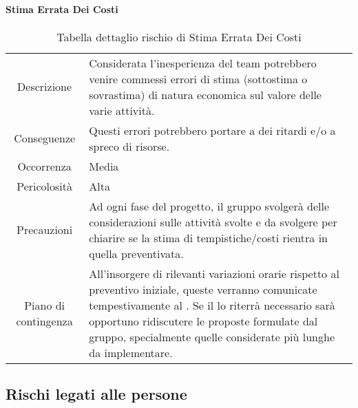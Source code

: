 \paragraph*{Stima Errata Dei Costi}
\renewcommand{\arraystretch}{1}
    \begin{table}[H]
        \begin{center}
            \setlength{\aboverulesep}{0pt}
            \setlength{\belowrulesep}{0pt}
            \setlength{\extrarowheight}{.75ex}
            \begin{tabular}{ c p{10cm} }
                \rowcolor{AzzurroGruppo!30} 
                \toprule
                Descrizione & Considerata l'inesperienza del team potrebbero venire commessi errori di stima (sottostima o sovrastima) di natura economica sul valore delle varie attività. \\
                Conseguenze & Questi errori potrebbero portare a dei ritardi e/o a spreco di risorse. \\
                Occorrenza & Media \\
                Pericolosità & Alta \\
                Precauzioni & Ad ogni fase del progetto, il gruppo svolgerà delle considerazioni sulle attività svolte e da svolgere per chiarire se la stima di tempistiche/costi rientra in quella preventivata. \\
                Piano di contingenza & All’insorgere di rilevanti variazioni orarie rispetto al preventivo iniziale, queste verranno comunicate tempestivamente al \proponente{}. Se il \proponente{} lo riterrà necessario sarà opportuno ridiscutere le proposte formulate dal gruppo, specialmente quelle considerate più lunghe da implementare. \\
                \bottomrule
            \end{tabular}
            \caption{Tabella dettaglio rischio di Stima Errata Dei Costi}
        \end{center}
    \end{table}

\subsection{Rischi legati alle persone}

